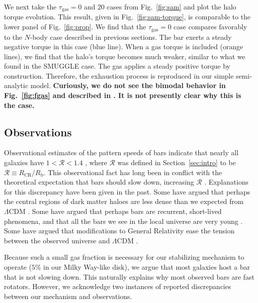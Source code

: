 \documentclass[twocolumn,linenumbers,trackchanges]{aastex631}
\newcommand{\RCR}{\ensuremath{R_{\textrm{CR}}}}
\newcommand{\Rot}{\ensuremath{\mathcal{R}}}
\newcommand{\Rb}{\ensuremath{R_{\textrm{b}}}}
\newcommand{\Nbody}{$N$-body}
\newcommand{\SMUGGLE}{SMUGGLE}
\begin{document}
We next take the $\tau_{\textrm{gas}}=0$ and $20$ cases from Fig.~\ref{fig:sam}
and plot the halo torque evolution. This result, given in
Fig.~\ref{fig:sam-torque}, is comparable to the lower panel of
Fig.~\ref{fig:prop}. We find that the $\tau_{\textrm{gas}}=0$ case compares
favorably to the \Nbody{} case described in previous sections. The bar exerts a
steady negative torque in this case (blue line). When a gas torque is included
(orange lines), we find that the halo's torque becomes much weaker, similar to
what we found in the \SMUGGLE{} case. The gas applies a steady positive torque
by construction. Therefore, the exhaustion process is reproduced in our simple
semi-analytic model. {\bf Curiously, we do not see the bimodal behavior in
Fig.~\ref{fig:fgas} and described in \citet{2010ApJ...719.1470V}. It is not
presently clear why this is the case.}

\subsection{Observations}
Observational estimates of the pattern speeds of bars indicate that nearly all
galaxies have $1 < \Rot < 1.4$ \citep{2011MSAIS..18...23C, 2015AA...576A.102A,
2019MNRAS.482.1733G, 2020MNRAS.491.3655G}, where $\Rot$ was defined in
Section~\ref{sec:intro} to be $\Rot\equiv \RCR/\Rb$. This observational fact has
long been in conflict with the theoretical expectation that bars should slow
down, increasing \Rot{} \citep[e.g.][]{1984MNRAS.209..729T, 1985MNRAS.213..451W,
2000ApJ...543..704D}. Explanations for this discrepancy have been given in the
past. Some have argued that perhaps the central regions of dark matter haloes
are less dense than we expected from $\Lambda\textrm{CDM}$
\citep[e.g.][]{2000ApJ...543..704D,2021AA...650L..16F}. Some have argued that
perhaps bars are recurrent, short-lived phenomena, and that all the bars we see
in the local universe are very young \citep{2002AA...392...83B,
2005MNRAS.364L..18B}. Some have argued that modifications to General Relativity
ease the tension between the observed universe and $\Lambda\textrm{CDM}$
\citep[e.g.][]{2021MNRAS.503.2833R, 2021MNRAS.508..926R}.

Because such a small gas fraction is necessary for our stabilizing mechanism to
operate ($5\%$ in our Milky Way-like disk), we argue that most galaxies host a
bar that is not slowing down. This naturally explains why most observed bars are
fast rotators. However, we acknowledge two instances of reported discrepancies
between our mechanism and observations.
\end{document}
